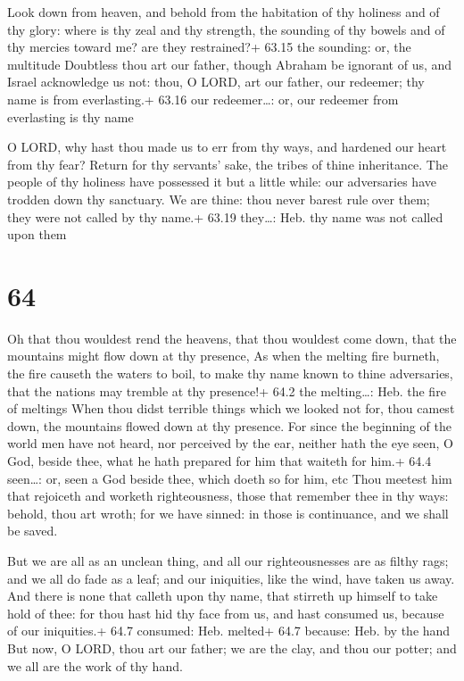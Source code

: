  Look down from heaven, and behold from the habitation of
thy holiness and of thy glory: where is thy zeal and thy strength, the
sounding of thy bowels and of thy mercies toward me? are they
restrained?+ 63.15 the sounding: or, the multitude 
Doubtless thou art our father, though Abraham be ignorant of us, and
Israel acknowledge us not: thou, O LORD, art our father, our redeemer;
thy name is from everlasting.+ 63.16 our redeemer\ldots: or, our
redeemer from everlasting is thy name

 O LORD, why hast thou made us to err from thy ways, and
hardened our heart from thy fear? Return for thy servants' sake, the
tribes of thine inheritance.  The people of thy holiness
have possessed it but a little while: our adversaries have trodden down
thy sanctuary.  We are thine: thou never barest rule over
them; they were not called by thy name.+ 63.19 they\ldots: Heb. thy name
was not called upon them

\hypertarget{section-63}{%
\section{64}\label{section-63}}

 Oh that thou wouldest rend the heavens, that thou wouldest
come down, that the mountains might flow down at thy presence,
 As when the melting fire burneth, the fire causeth the
waters to boil, to make thy name known to thine adversaries, that the
nations may tremble at thy presence!+ 64.2 the melting\ldots: Heb. the
fire of meltings  When thou didst terrible things which we
looked not for, thou camest down, the mountains flowed down at thy
presence.  For since the beginning of the world men have not
heard, nor perceived by the ear, neither hath the eye seen, O God,
beside thee, what he hath prepared for him that waiteth for him.+ 64.4
seen\ldots: or, seen a God beside thee, which doeth so for him, etc
 Thou meetest him that rejoiceth and worketh righteousness,
those that remember thee in thy ways: behold, thou art wroth; for we
have sinned: in those is continuance, and we shall be saved.

 But we are all as an unclean thing, and all our
righteousnesses are as filthy rags; and we all do fade as a leaf; and
our iniquities, like the wind, have taken us away.  And
there is none that calleth upon thy name, that stirreth up himself to
take hold of thee: for thou hast hid thy face from us, and hast consumed
us, because of our iniquities.+ 64.7 consumed: Heb. melted+ 64.7
because: Heb. by the hand  But now, O LORD, thou art our
father; we are the clay, and thou our potter; and we all are the work of
thy hand.

